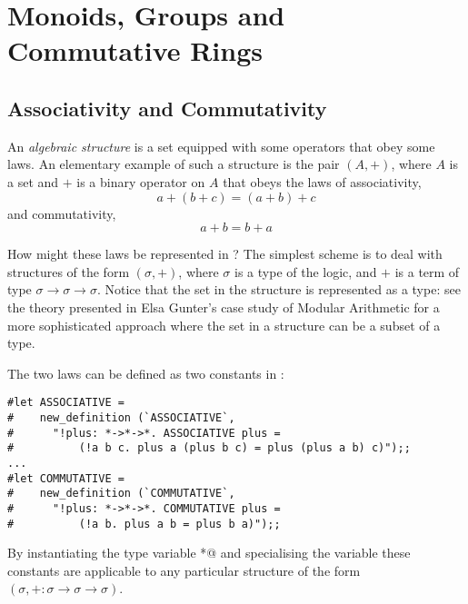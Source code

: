 
\section{Monoids, Groups and Commutative Rings}
\label{MonoidsGroupsRings}

\subsection{Associativity and Commutativity}

An {\em algebraic structure} is a set equipped with some operators that
obey some laws.  An elementary example of such a structure is the pair
$(A,+)$, where $A$ is a set and $+$ is a binary operator on $A$ that obeys
the laws of associativity,
\[
a + (b + c) = (a + b) + c
\]
and commutativity,
\[
a + b = b + a
\]

How might these laws be represented in \HOL{}?  The simplest scheme is
to deal with structures of the form $(\sigma, +)$, where $\sigma$ is a
type of the \HOL{} logic, and $+$ is a \HOL{} term of type
$\sigma\to\sigma\to\sigma$.  Notice that the set in the structure is
represented as a \HOL{} type: see the theory \verb@group@ presented in
Elsa Gunter's case study of Modular Arithmetic for a more sophisticated
approach where the set in a structure can be a subset of a \HOL{} type.

The two laws can be defined as two constants in \HOL{}:
\begin{session}
\begin{verbatim}
#let ASSOCIATIVE =
#    new_definition (`ASSOCIATIVE`,
#      "!plus: *->*->*. ASSOCIATIVE plus =
#          (!a b c. plus a (plus b c) = plus (plus a b) c)");;
...
#let COMMUTATIVE =
#    new_definition (`COMMUTATIVE`,
#      "!plus: *->*->*. COMMUTATIVE plus =
#          (!a b. plus a b = plus b a)");;
\end{verbatim}
\end{session}
By instantiating the type variable \verb@*@ and specialising the variable
\verb@plus@ these constants are applicable to any particular structure
of the form $(\sigma, +: \sigma\to\sigma\to\sigma)$.

